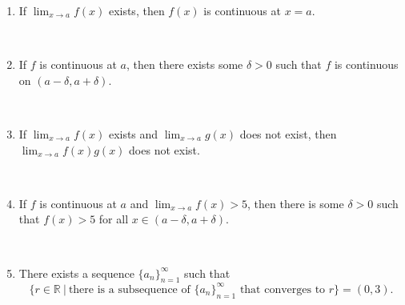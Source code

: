\documentclass[12pt]{amsart}
\def\d{\delta}
\newcommand{\R}{{\mathbb{R}}}
\numberwithin{equation}{section}
\theoremstyle{plain} %
\theoremstyle{definition}
\theoremstyle{remark}
\begin{document}
\begin{enumerate}
	 
	 \item  If $\lim_{x\to a} f(x)$ exists, then $f(x)$ is continuous at $x=a$.
	 
	 \
	 

	 
	 \item  If $f$ is continuous at $a$, then there exists some $\d>0$ such that $f$ is continuous on $(a-\d, a+\d)$.
	 
	 \
	 
	 	\item If $\lim_{x\to a} f(x)$ exists and $\lim_{x\to a} g(x)$ does not exist, then $\lim_{x\to a} f(x)  g(x)$ does not exist.
	
	\

	 
	 	 \item  If $f$ is continuous at $a$ and $\lim_{x\to a} f(x) > 5$, then there is some $\delta>0$ such that $f(x)>5 $ for all $x\in (a-\delta,a+\delta)$.
	 
	 \
	 
	 \item There exists a sequence $\{a_n\}_{n=1}^\infty$ such that 
	 \[ \{ r\in\R \ | \ \text{there is a subsequence of $\{a_n\}_{n=1}^\infty$ that converges to $r$} \} = (0,3).\]
	 
	 

 
 
 
 	 
	 
	 
	 
	 

		
\end{enumerate}
\end{document}
